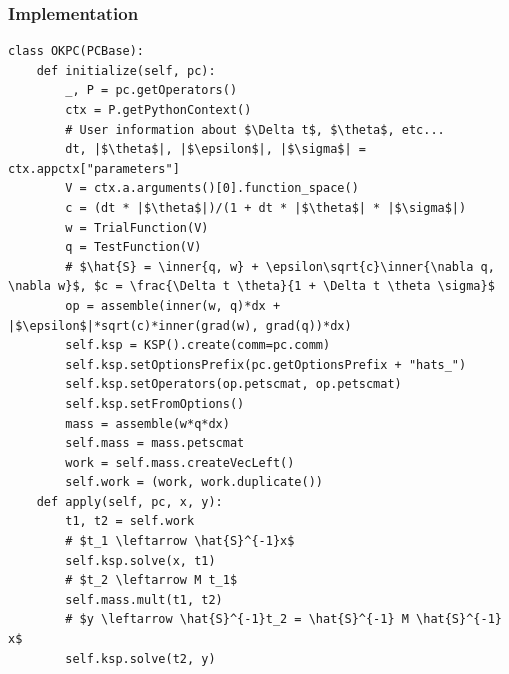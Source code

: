 \documentclass[presentation,aspectratio=43]{beamer}
\newcommand{\inner}[1]{\left\langle #1 \right \rangle}
\begin{document}
\begin{frame}[fragile]
  \frametitle{Implementation}
\begin{verbatim}
class OKPC(PCBase):
    def initialize(self, pc):
        _, P = pc.getOperators()
        ctx = P.getPythonContext()
        # User information about $\Delta t$, $\theta$, etc...
        dt, |$\theta$|, |$\epsilon$|, |$\sigma$| = ctx.appctx["parameters"]
        V = ctx.a.arguments()[0].function_space()
        c = (dt * |$\theta$|)/(1 + dt * |$\theta$| * |$\sigma$|)
        w = TrialFunction(V)
        q = TestFunction(V)
        # $\hat{S} = \inner{q, w} + \epsilon\sqrt{c}\inner{\nabla q, \nabla w}$, $c = \frac{\Delta t \theta}{1 + \Delta t \theta \sigma}$
        op = assemble(inner(w, q)*dx + |$\epsilon$|*sqrt(c)*inner(grad(w), grad(q))*dx)
        self.ksp = KSP().create(comm=pc.comm)
        self.ksp.setOptionsPrefix(pc.getOptionsPrefix + "hats_")
        self.ksp.setOperators(op.petscmat, op.petscmat)
        self.ksp.setFromOptions()
        mass = assemble(w*q*dx)
        self.mass = mass.petscmat
        work = self.mass.createVecLeft()
        self.work = (work, work.duplicate())
    def apply(self, pc, x, y):
        t1, t2 = self.work
        # $t_1 \leftarrow \hat{S}^{-1}x$
        self.ksp.solve(x, t1)
        # $t_2 \leftarrow M t_1$
        self.mass.mult(t1, t2)
        # $y \leftarrow \hat{S}^{-1}t_2 = \hat{S}^{-1} M \hat{S}^{-1} x$
        self.ksp.solve(t2, y)
\end{verbatim}
\end{frame}
\end{document}
